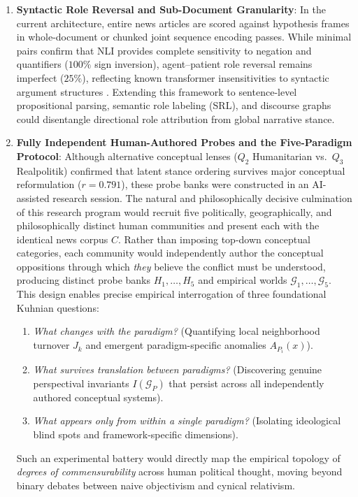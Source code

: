\begin{enumerate}
    \item \textbf{Syntactic Role Reversal and Sub-Document Granularity}: In the current architecture, entire news articles are scored against hypothesis frames in whole-document or chunked joint sequence encoding passes. While minimal pairs confirm that NLI provides complete sensitivity to negation and quantifiers ($100\%$ sign inversion), agent--patient role reversal remains imperfect ($25\%$), reflecting known transformer insensitivities to syntactic argument structures \citep{ettinger2020}. Extending this framework to sentence-level propositional parsing, semantic role labeling (SRL), and discourse graphs could disentangle directional role attribution from global narrative stance.
    \item \textbf{Fully Independent Human-Authored Probes and the Five-Paradigm Protocol}: Although alternative conceptual lenses ($Q_2$ Humanitarian vs.\ $Q_3$ Realpolitik) confirmed that latent stance ordering survives major conceptual reformulation ($r = 0.791$), these probe banks were constructed in an AI-assisted research session. The natural and philosophically decisive culmination of this research program would recruit five politically, geographically, and philosophically distinct human communities and present each with the identical news corpus $C$. Rather than imposing top-down conceptual categories, each community would independently author the conceptual oppositions through which \emph{they} believe the conflict must be understood, producing distinct probe banks $H_1, \dots, H_5$ and empirical worlds $\mathcal{G}_1, \dots, \mathcal{G}_5$. This design enables precise empirical interrogation of three foundational Kuhnian questions:
    \begin{enumerate}
        \item \emph{What changes with the paradigm?} (Quantifying local neighborhood turnover $J_k$ and emergent paradigm-specific anomalies $A_{P_i}(x)$).
        \item \emph{What survives translation between paradigms?} (Discovering genuine perspectival invariants $I(\mathcal{G}_P)$ that persist across all independently authored conceptual systems).
        \item \emph{What appears only from within a single paradigm?} (Isolating ideological blind spots and framework-specific dimensions).
    \end{enumerate}
    Such an experimental battery would directly map the empirical topology of \emph{degrees of commensurability} across human political thought, moving beyond binary debates between naive objectivism and cynical relativism.

\end{enumerate}
